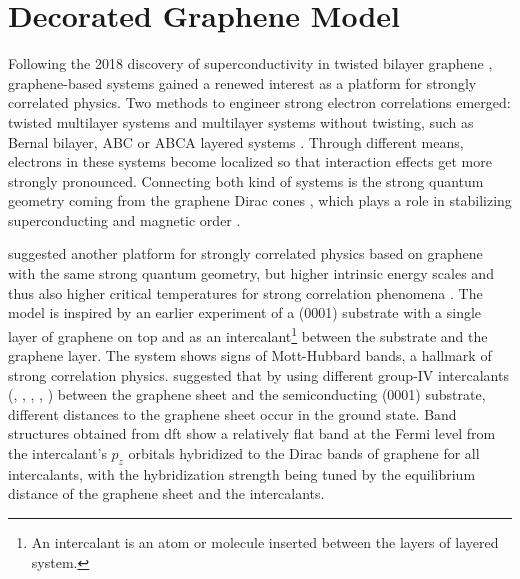 \documentclass[../main.tex]{subfiles}
\begin{document}
\chapter{Decorated Graphene Model}\label{ch:decorated graphene model}

Following the 2018 discovery of superconductivity in twisted bilayer graphene \cite{caoUnconventionalSuperconductivityMagicangle2018}, graphene-based systems gained a renewed interest as a platform for strongly correlated physics.
Two methods to engineer strong electron correlations emerged: twisted multilayer systems  \cite{caoUnconventionalSuperconductivityMagicangle2018, tanakaSuperfluidStiffnessMagicangle2025, tormaSuperconductivitySuperfluidityQuantum2022, andreigrapheneBilayersTwist2020, xieTopologyBoundedSuperfluidWeight2020} and multilayer systems without twisting, such as Bernal bilayer, ABC or ABCA layered systems \cite{pantaleonSuperconductivityCorrelatedPhases2023}.
Through different means, electrons in these systems become localized so that interaction effects get more strongly pronounced.
Connecting both kind of systems is the strong quantum geometry coming from the graphene Dirac cones \cite{wehlingDiracMaterials2014}, which plays a role in stabilizing superconducting \cite{liangBandGeometryBerry2017, tanakaSuperfluidStiffnessMagicangle2025} and magnetic order \cite{abouelkomsanQuantumMetricInduced2023, liuOrbitalMagneticStates2021}.

\citeauthor{wittQuantumGeometryLocal2025} suggested another platform for strongly correlated physics based on graphene with the same strong quantum geometry, but higher intrinsic energy scales and thus also higher critical temperatures for strong correlation phenomena \cite{wittQuantumGeometryLocal2025}.
The model is inspired by an earlier experiment \cite{ghosalElectronicCorrelationsEpitaxial2024} of a (0001) substrate with a single layer of graphene on top and  as an intercalant\footnote{An intercalant is an atom or molecule inserted between the layers of layered system.} between the substrate and the graphene layer.
The system shows signs of Mott-Hubbard bands, a hallmark of strong correlation physics.
\citeauthor{wittQuantumGeometryLocal2025} suggested that by using different group-IV intercalants (, , , , ) between the graphene sheet and the semiconducting (0001) substrate, different distances to the graphene sheet occur in the ground state.
Band structures obtained from \gls{dft} show a relatively flat band at the Fermi level from the intercalant’s \(p_z\) orbitals hybridized to the Dirac bands of graphene for all intercalants, with the hybridization strength being tuned by the equilibrium distance of the graphene sheet and the intercalants.
\end{document}
